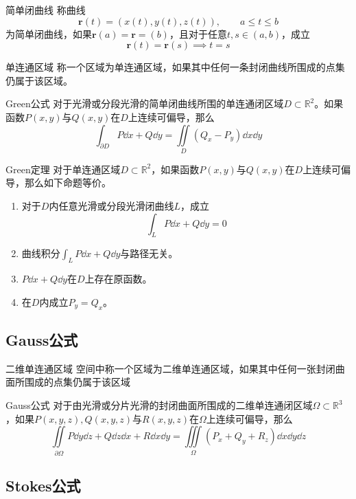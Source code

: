 \documentclass[lang = cn, scheme = chinese, thmcnt = section]{elegantbook}
\newcommand{\R}{\mathbb{R}}            %
\newcommand{\sub}{\subset}             %
\newcommand{\bs}{\boldsymbol}          %
\newcommand{\dis}{\displaystyle}
\newcommand{\IInt}{\iint\limits}
\newcommand{\IIInt}{\iiint\limits}
\begin{document}
\begin{definition}{简单闭曲线}
	称曲线
	$$
	\bs{r}(t)=(x(t),y(t),z(t)),\qquad a\le t \le b
	$$
	为简单闭曲线，如果$\bs{r}(a)=\bs{r}=(b)$，且对于任意$t,s\in (a,b)$，成立
	$$
	\bs{r}(t)=\bs{r}(s)\implies t=s
	$$
\end{definition}

\begin{definition}{单连通区域}
	称一个区域为单连通区域，如果其中任何一条封闭曲线所围成的点集仍属于该区域。
\end{definition}

\begin{theorem}{Green公式}
	对于光滑或分段光滑的简单闭曲线所围的单连通闭区域$D\sub\R^2$。如果函数$P(x,y)$与$Q(x,y)$在$D$上连续可偏导，那么
	$$
	\int_{\partial D}P\dd x+Q\dd y
	=\IInt_D\left(Q_x-P_y\right)\dd x\dd y
	$$
\end{theorem}

\begin{theorem}{Green定理}
	对于单连通区域$D\sub\R^2$，如果函数$P(x,y)$与$Q(x,y)$在$D$上连续可偏导，那么如下命题等价。
	\begin{enumerate}
		\item 对于$D$内任意光滑或分段光滑闭曲线$L$，成立
		$$
		\int_L P\dd x+Q\dd y=0
		$$
		\item 曲线积分$\dis \int_L P\dd x+Q\dd y$与路径无关。
		\item $P\dd x+Q\dd y$在$D$上存在原函数。
		\item 在$D$内成立$P_y=Q_x$。
	\end{enumerate}
\end{theorem}

\subsection{Gauss公式}

\begin{definition}{二维单连通区域}
	空间中称一个区域为二维单连通区域，如果其中任何一张封闭曲面所围成的点集仍属于该区域
\end{definition}

\begin{theorem}{Gauss公式}
	对于由光滑或分片光滑的封闭曲面所围成的二维单连通闭区域$\Omega\sub\R^3$，如果$P(x,y,z),Q(x,y,z)$与$R(x,y,z)$在$\Omega$上连续可偏导，那么
	$$
	\IInt_{\partial\Omega}P\dd y\dd z+Q\dd z\dd x+R\dd x\dd y
	=\IIInt_\Omega
	\left(P_x+Q_y+R_z\right)\dd x\dd y\dd z
	$$
\end{theorem}

\subsection{Stokes公式}
\end{document}
